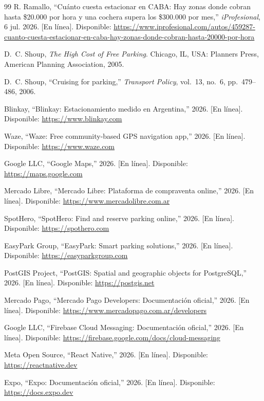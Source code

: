 \documentclass[conference,a4paper]{IEEEtran}
\begin{document}
\begin{thebibliography}{99}
R. Ramallo, ``Cuánto cuesta estacionar en CABA: Hay zonas donde cobran hasta \$20.000 por hora y una cochera supera los \$300.000 por mes,'' \textit{iProfesional}, 6 jul. 2026. [En línea]. Disponible: \url{https://www.iprofesional.com/autos/459287-cuanto-cuesta-estacionar-en-caba-hay-zonas-donde-cobran-hasta-20000-por-hora}

D.~C. Shoup, \textit{The High Cost of Free Parking}. Chicago, IL, USA: Planners Press, American Planning Association, 2005.

D.~C. Shoup, ``Cruising for parking,'' \textit{Transport Policy}, vol.~13, no.~6, pp.~479--486, 2006.

Blinkay, ``Blinkay: Estacionamiento medido en Argentina,'' 2026. [En línea]. Disponible: \url{https://www.blinkay.com}

Waze, ``Waze: Free community-based GPS navigation app,'' 2026. [En línea]. Disponible: \url{https://www.waze.com}

Google LLC, ``Google Maps,'' 2026. [En línea]. Disponible: \url{https://maps.google.com}

Mercado Libre, ``Mercado Libre: Plataforma de compraventa online,'' 2026. [En línea]. Disponible: \url{https://www.mercadolibre.com.ar}

SpotHero, ``SpotHero: Find and reserve parking online,'' 2026. [En línea]. Disponible: \url{https://spothero.com}

EasyPark Group, ``EasyPark: Smart parking solutions,'' 2026. [En línea]. Disponible: \url{https://easyparkgroup.com}

PostGIS Project, ``PostGIS: Spatial and geographic objects for PostgreSQL,'' 2026. [En línea]. Disponible: \url{https://postgis.net}

Mercado Pago, ``Mercado Pago Developers: Documentación oficial,'' 2026. [En línea]. Disponible: \url{https://www.mercadopago.com.ar/developers}

Google LLC, ``Firebase Cloud Messaging: Documentación oficial,'' 2026. [En línea]. Disponible: \url{https://firebase.google.com/docs/cloud-messaging}

Meta Open Source, ``React Native,'' 2026. [En línea]. Disponible: \url{https://reactnative.dev}

Expo, ``Expo: Documentación oficial,'' 2026. [En línea]. Disponible: \url{https://docs.expo.dev}


\end{thebibliography}
\end{document}
